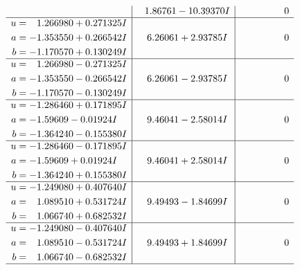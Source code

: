 \documentclass[1p]{elsarticle_modified}
\theoremstyle{definition}
\begin{document}
$$\begin{array}{c|c|c}
 & \phantom{-}1.86761 - 10.39370 I & \phantom{-0.000000 } 0 \\ \hline\begin{aligned}
u &= \phantom{-}1.266980 + 0.271325 I \\
a &= -1.353550 + 0.266542 I \\
b &= -1.170570 + 0.130249 I\end{aligned}
 & \phantom{-}6.26061 + 2.93785 I & \phantom{-0.000000 } 0 \\ \hline\begin{aligned}
u &= \phantom{-}1.266980 - 0.271325 I \\
a &= -1.353550 - 0.266542 I \\
b &= -1.170570 - 0.130249 I\end{aligned}
 & \phantom{-}6.26061 - 2.93785 I & \phantom{-0.000000 } 0 \\ \hline\begin{aligned}
u &= -1.286460 + 0.171895 I \\
a &= -1.59609 - 0.01924 I \\
b &= -1.364240 - 0.155380 I\end{aligned}
 & \phantom{-}9.46041 - 2.58014 I & \phantom{-0.000000 } 0 \\ \hline\begin{aligned}
u &= -1.286460 - 0.171895 I \\
a &= -1.59609 + 0.01924 I \\
b &= -1.364240 + 0.155380 I\end{aligned}
 & \phantom{-}9.46041 + 2.58014 I & \phantom{-0.000000 } 0 \\ \hline\begin{aligned}
u &= -1.249080 + 0.407640 I \\
a &= \phantom{-}1.089510 + 0.531724 I \\
b &= \phantom{-}1.066740 + 0.682532 I\end{aligned}
 & \phantom{-}9.49493 - 1.84699 I & \phantom{-0.000000 } 0 \\ \hline\begin{aligned}
u &= -1.249080 - 0.407640 I \\
a &= \phantom{-}1.089510 - 0.531724 I \\
b &= \phantom{-}1.066740 - 0.682532 I\end{aligned}
 & \phantom{-}9.49493 + 1.84699 I & \phantom{-0.000000 } 0\\
 \hline 
 \end{array}$$\newpage$$\begin{array}{c|c|c}  

\end{array}$$
\end{document}
